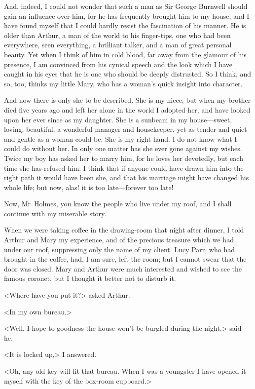 And, indeed, I could not wonder that such a man as Sir George Burnwell should gain an influence over him, for he has frequently brought him to my house, and I have found myself that I could hardly resist the fascination of his manner. He is older than Arthur, a man of the world to his finger-tips, one who had been everywhere, seen everything, a brilliant talker, and a man of great personal beauty. Yet when I think of him in cold blood, far away from the glamour of his presence, I am convinced from his cynical speech and the look which I have caught in his eyes that he is one who should be deeply distrusted. So I think, and so, too, thinks my little Mary, who has a woman's quick insight into character.

And now there is only she to be described. She is my niece; but when my brother died five years ago and left her alone in the world I adopted her, and have looked upon her ever since as my daughter. She is a sunbeam in my house—sweet, loving, beautiful, a wonderful manager and housekeeper, yet as tender and quiet and gentle as a woman could be. She is my right hand. I do not know what I could do without her. In only one matter has she ever gone against my wishes. Twice my boy has asked her to marry him, for he loves her devotedly, but each time she has refused him. I think that if anyone could have drawn him into the right path it would have been she, and that his marriage might have changed his whole life; but now, alas! it is too late—forever too late!

Now, Mr~Holmes, you know the people who live under my roof, and I shall continue with my miserable story.

When we were taking coffee in the drawing-room that night after dinner, I told Arthur and Mary my experience, and of the precious treasure which we had under our roof, suppressing only the name of my client. Lucy Parr, who had brought in the coffee, had, I am sure, left the room; but I cannot swear that the door was closed. Mary and Arthur were much interested and wished to see the famous coronet, but I thought it better not to disturb it.

<Where have you put it?> asked Arthur.

<In my own bureau.>

<Well, I hope to goodness the house won't be burgled during the night.> said he.

<It is locked up,> I answered.

<Oh, any old key will fit that bureau. When I was a youngster I have opened it myself with the key of the box-room cupboard.>

